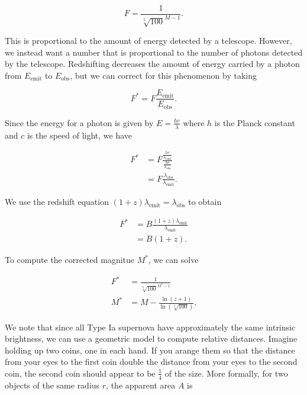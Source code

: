 \documentclass{article}
\begin{document}
\begin{equation}
  F = \frac{1}{\sqrt[5]{100}^{M - 1}}.
\end{equation}

This is proportional to the amount of energy detected by a telescope. However,
we instead want a number that is proportional to the number of photons detected
by the telescope. Redshifting decreases the amount of energy carried by a
photon from $E_{\text{emit}}$ to $E_{\text{obs}}$, but we can correct for this
phenomenon by taking

\begin{equation}
  F^{*} = F \frac{E_{\text{emit}}}{E_{\text{obs}}}.
\end{equation}

Since the energy for a photon is given by $E = \frac{hc}{\lambda}$ where $h$ is
the Planck constant and $c$ is the speed of light, we have

\begin{equation}
\begin{aligned}
  F^{*} &= F \frac{\frac{hc}{\lambda_{\text{emit}}}}{\frac{hc}{\lambda_{\text{obs}}}} \\
        &= F \frac{\lambda_{\text{obs}}}{\lambda_{\text{emit}}}.
\end{aligned}
\end{equation}

We use the redshift equation $(1 + z)\lambda_{\text{emit}} =
\lambda_{\text{obs}}$ to obtain

\begin{equation}
\begin{aligned}
  F^{*} &= B \frac{(1 + z)\lambda_{\text{emit}}}{\lambda_{\text{emit}}} \\
        &= B(1 + z).
\end{aligned}
\end{equation}

To compute the corrected magnitue $M^*$, we can solve

\begin{equation}
\begin{aligned}
   F^* &= \frac{1}{\sqrt[5]{100}^{M^* - 1}} \\
   M^* &= M - \frac{\ln{(z + 1)}}{\ln{(\sqrt[5]{100})}}.
\end{aligned}
\end{equation}

We note that since all Type Ia supernova have approximately the same intrinsic
brightness, we can use a geometric model to compute relative distances. Imagine
holding up two coins, one in each hand.  If you arange them so that the
distance from your eyes to the first coin double the distance from your eyes to
the second coin, the second coin should appear to be $\frac{1}{4}$ of the size.
More formally, for two objects of the same radius $r$, the apparent area $A$
is
\end{document}
